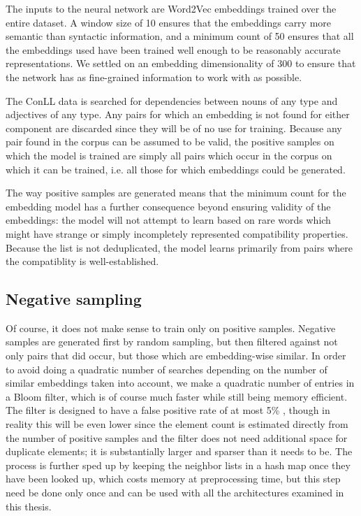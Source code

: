 \documentclass[a4paper, 11pt]{scrartcl}
\begin{document}
The inputs to the neural network are Word2Vec embeddings trained over the entire dataset. A window size of 10 ensures that the embeddings carry more semantic than syntactic information, and a minimum count of 50 ensures that all the embeddings used have been trained well enough to be reasonably accurate representations. We settled on an embedding dimensionality of 300 to ensure that the network has as fine-grained information to work with as possible.

The ConLL data is searched for dependencies between nouns of any type and adjectives of any type. Any pairs for which an embedding is not found for either component are discarded since they will be of no use for training. Because any pair found in the corpus can be assumed to be valid, the positive samples on which the model is trained are simply all pairs which occur in the corpus on which it can be trained, i.e. all those for which embeddings could be generated.

The way positive samples are generated means that the minimum count for the embedding model has a further consequence beyond ensuring validity of the embeddings: the model will not attempt to learn based on rare words which might have strange or simply incompletely represented compatibility properties. Because the list is not deduplicated, the model learns primarily from pairs where the compatiblity is well-established.

\subsection{Negative sampling}

Of course, it does not make sense to train only on positive samples. Negative samples are generated first by random sampling, but then filtered against not only pairs that did occur, but those which are embedding-wise similar. In order to avoid doing a quadratic number of searches depending on the number of similar embeddings taken into account, we make a quadratic number of entries in a Bloom filter, which is of course much faster while still being memory efficient. The filter is designed to have a false positive rate of at most 5\% , though in reality this will be even lower since the element count is estimated directly from the number of positive samples and the filter does not need additional space for duplicate elements; it is substantially larger and sparser than it needs to be. The process is further sped up by keeping the neighbor lists in a hash map once they have been looked up, which costs memory at preprocessing time, but this step need be done only once and can be used with all the architectures examined in this thesis.
\end{document}
